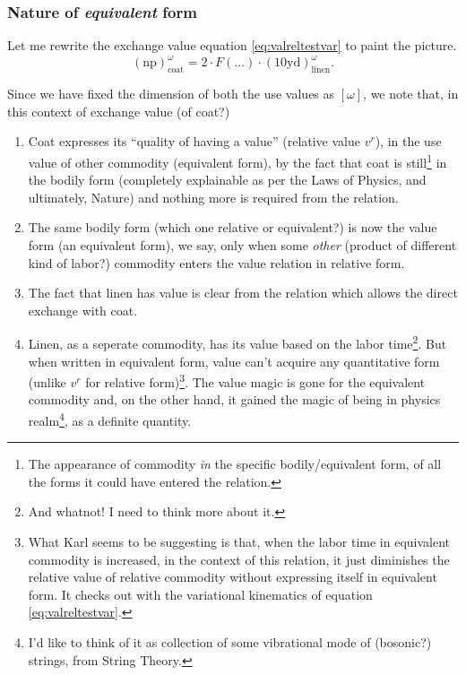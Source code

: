 \documentclass[12pt]{extarticle}
\theoremstyle{definition}
\newenvironment{remark}[1][Remark]{\begin{trivlist}
\item[\hskip \labelsep {\bfseries #1}]}{\end{trivlist}}
\begin{document}
\subsubsection{Nature of \emph{equivalent} form}
Let me rewrite the exchange value equation \ref{eq:valreltestvar} to paint the picture.
\begin{equation}
  \label{eq:exvalrep}
   (\text{np})_{\text{coat}}^{\omega} = 2\cdot F(\ldots)\cdot (10\text{yd})_{\text{linen}}^{\omega}.
 \end{equation}
 \begin{remark}
   \label{rem:equiform}
   Since we have fixed the dimension of both the use values as $[\omega]$, we note that, in this context of exchange value (of coat?)
   \begin{enumerate}
   \item Coat expresses its ``quality of having a value'' (relative value $v^r$), in the use value of other commodity (equivalent form), by the fact that coat is still\footnote{The appearance of commodity \emph{in} the specific bodily/equivalent form, of all the forms it could have entered the relation.} in the bodily form (completely explainable as per the Laws of Physics, and ultimately, Nature) and nothing more is required from the relation.
   \item The same bodily form (which one relative or equivalent?) is now the value form (an equivalent form), we say, only when some \emph{other} (product of different kind of labor?) commodity enters the value relation in relative form.
   \item The fact that linen has value is clear from the relation which allows the direct exchange with coat.
   \item Linen, as a seperate commodity, has its value based on the labor time\footnote{And whatnot!  I need to think more about it.}.  But when written in equivalent form, value can't acquire any quantitative form (unlike $v^r$ for relative form)\footnote{What Karl seems to be suggesting is that, when the labor time in equivalent commodity is increased, in the context of this relation, it just diminishes the relative value of relative commodity without expressing itself in equivalent form.  It checks out with the variational kinematics of equation \ref{eq:valreltestvar}.}.  The value magic is gone for the equivalent commodity and, on the other hand, it gained the magic of being in physics realm\footnote{I'd like to think of it as collection of some vibrational mode of (bosonic?) strings, from String Theory.}, as a definite quantity.

\end{enumerate}
\end{remark}
\end{document}
